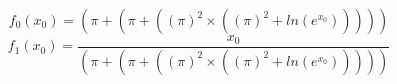 \documentclass{article}
\begin{document}
\begin{equation}
f_0(x_0)=\left(\pi + \left(\pi + \left( (\pi )^2 \times \left( (\pi )^2 + ln( e^{x_0 })\right)\right)\right)\right)
\end{equation}\begin{equation}
f_1(x_0)=\frac{x_0}{\left(\pi + \left(\pi + \left( (\pi )^2 \times \left( (\pi )^2 + ln( e^{x_0 })\right)\right)\right)\right)}
\end{equation}
\end{document}
